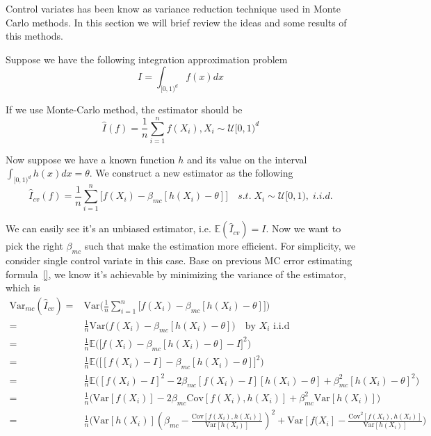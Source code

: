 




Control variates has been know as variance reduction technique used in Monte Carlo methods. In this section we will brief review the ideas and some results of this methods.

Suppose we have the following integration approximation problem
\[I= \int_{[0,1)^d}f(x)dx\]

If we use Monte-Carlo method, the estimator should be 
\[
\hat{I}(f)=\frac{1}{n}\sum_{i=1}^{n}f(X_i), X_i\sim \mathcal{U}[0,1)^d
\]

 
Now suppose we have a known function $h$ and its value on the interval
$\int_{[0,1)^d} h(x)dx = \theta$.  We construct a new estimator as the following 
\[ \hat{I}_{cv}(f)=\frac{1}{n}\sum_{i=1}^{n}\Big[ f(X_i)-\beta_{mc}[h(X_i)-\theta] \Big] \quad s.t.\; X_i\sim \mathcal{U}[0,1), \; i.i.d.\]

We can easily see it's an unbiased estimator, i.e. $\mathbb{E}(\hat{I}_{cv}) = I$.
Now we want to pick the right $\beta_{mc}$ such that make the estimation more efficient.
For simplicity, we consider single control variate in this case.
Base on previous MC error estimating formula~\eqref{}, we know it's achievable by minimizing the variance of the estimator, which is 
\begin{align*}
	\mathrm{Var}_{mc}(\hat{I}_{cv})
    =&\mathrm{Var}\Big( \frac{1}{n}\sum_{i=1}^{n}\big[ f(X_i)-\beta_{mc}[h(X_i)-\theta] \big]\Big)\\
    =&\frac{1}{n}\mathrm{Var}\Big(f(X_i)-\beta_{mc}[h(X_i)-\theta]\Big)\quad \text{by $X_i$ i.i.d} \\
    =&\frac{1}{n}\mathbb{E}\Big(\big[f(X_i)-\beta_{mc}[h(X_i)-\theta]-I\big]^2 \Big) \\
    =&\frac{1}{n}\mathbb{E}\Big(\big[ [f(X_i)-I] -\beta_{mc}[h(X_i)-\theta]\big]^2 \Big) \\
    =&\frac{1}{n}\mathbb{E}\big([f(X_i)-I]^2-2\beta_{mc}[f(X_i)-I][h(X_i)-\theta]+\beta_{mc}^2[h(X_i)-\theta]^2 \Big)\\
    =&\frac{1}{n}\Big(\mathrm{Var}[f(X_i)]-2\beta_{mc}\mathrm{Cov}[f(X_i),h(X_i)]+\beta_{mc}^2\mathrm{Var}[h(X_i)]\Big)\\
=&\frac{1}{n}\Big(\mathrm{Var}[h(X_i)](\beta_{mc}-\frac{\mathrm{Cov}[f(X_i),h(X_i)]}{\mathrm{Var}[h(X_i)]})^2+\mathrm{Var}[f(X_i]-\frac{\mathrm{Cov}^2[f(X_i),h(X_i)]}{\mathrm{Var}[h(X_i)]} \Big)
\end{align*}

